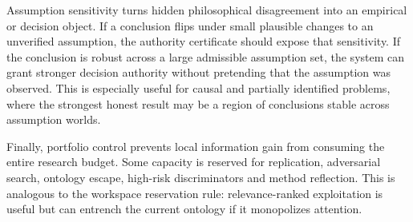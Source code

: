 Assumption sensitivity turns hidden philosophical disagreement into an empirical or decision object. If a conclusion flips under small plausible changes to an unverified assumption, the authority certificate should expose that sensitivity. If the conclusion is robust across a large admissible assumption set, the system can grant stronger decision authority without pretending that the assumption was observed. This is especially useful for causal and partially identified problems, where the strongest honest result may be a region of conclusions stable across assumption worlds.

Finally, portfolio control prevents local information gain from consuming the entire research budget. Some capacity is reserved for replication, adversarial search, ontology escape, high-risk discriminators and method reflection. This is analogous to the workspace reservation rule: relevance-ranked exploitation is useful but can entrench the current ontology if it monopolizes attention.
